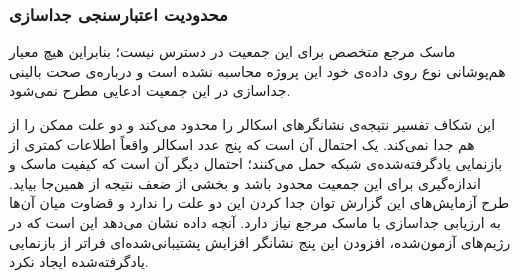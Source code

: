 \subsubsection{محدودیت اعتبارسنجی جداسازی}

ماسک مرجع متخصص برای این جمعیت در دسترس نیست؛ بنابراین هیچ معیار هم‌پوشانی نوع  روی داده‌ی خود این پروژه محاسبه نشده است و درباره‌ی صحت بالینی جداسازی در این جمعیت ادعایی مطرح نمی‌شود.

این شکاف تفسیر نتیجه‌ی نشانگرهای اسکالر را محدود می‌کند و دو علت ممکن را از هم جدا نمی‌کند. یک احتمال آن است که پنج عدد اسکالر واقعاً اطلاعات کمتری از بازنمایی یادگرفته‌شده‌ی شبکه حمل می‌کنند؛ احتمال دیگر آن است که کیفیت ماسک و اندازه‌گیری برای این جمعیت محدود باشد و بخشی از ضعف نتیجه از همین‌جا بیاید. طرح آزمایش‌های این گزارش توان جدا کردن این دو علت را ندارد و قضاوت میان آن‌ها به ارزیابی جداسازی با ماسک مرجع نیاز دارد. آنچه داده نشان می‌دهد این است که در رژیم‌های آزمون‌شده، افزودن این پنج نشانگر افزایش پشتیبانی‌شده‌ای فراتر از بازنمایی یادگرفته‌شده ایجاد نکرد.
